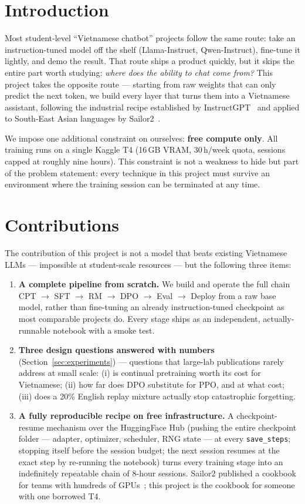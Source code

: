 \documentclass[10pt,twocolumn]{article}
\begin{document}
\section{Introduction}

Most student-level ``Vietnamese chatbot'' projects follow the same route: take an instruction-tuned model off the shelf (Llama-Instruct, Qwen-Instruct), fine-tune it lightly, and demo the result. That route ships a product quickly, but it skips the entire part worth studying: \emph{where does the ability to chat come from?} This project takes the opposite route --- starting from raw weights that can only predict the next token, we build every layer that turns them into a Vietnamese assistant, following the industrial recipe established by InstructGPT~\citep{ouyang2022instructgpt} and applied to South-East Asian languages by Sailor2~\citep{dou2025sailor2}.

We impose one additional constraint on ourselves: \textbf{free compute only}. All training runs on a single Kaggle T4 (16\,GB VRAM, 30\,h/week quota, sessions capped at roughly nine hours). This constraint is not a weakness to hide but part of the problem statement: every technique in this project must survive an environment where the training session can be terminated at any time.

\section{Contributions}

The contribution of this project is not a model that beats existing Vietnamese LLMs --- impossible at student-scale resources --- but the following three items:

\begin{enumerate}[leftmargin=*]
  \item \textbf{A complete pipeline from scratch.} We build and operate the full chain CPT $\to$ SFT $\to$ RM $\to$ DPO $\to$ Eval $\to$ Deploy from a raw base model, rather than fine-tuning an already instruction-tuned checkpoint as most comparable projects do. Every stage ships as an independent, actually-runnable notebook with a smoke test.
  \item \textbf{Three design questions answered with numbers} (Section~\ref{sec:experiments}) --- questions that large-lab publications rarely address at small scale: (i) is continual pretraining worth its cost for Vietnamese; (ii) how far does DPO substitute for PPO, and at what cost; (iii) does a 20\% English replay mixture actually stop catastrophic forgetting.
  \item \textbf{A fully reproducible recipe on free infrastructure.} A checkpoint-resume mechanism over the HuggingFace Hub (pushing the entire checkpoint folder --- adapter, optimizer, scheduler, RNG state --- at every \texttt{save\_steps}; stopping itself before the session budget; the next session resumes at the exact step by re-running the notebook) turns every training stage into an indefinitely repeatable chain of 8-hour sessions. Sailor2 published a cookbook for teams with hundreds of GPUs~\citep{dou2025sailor2}; this project is the cookbook for someone with one borrowed T4.
\end{enumerate}
\end{document}
